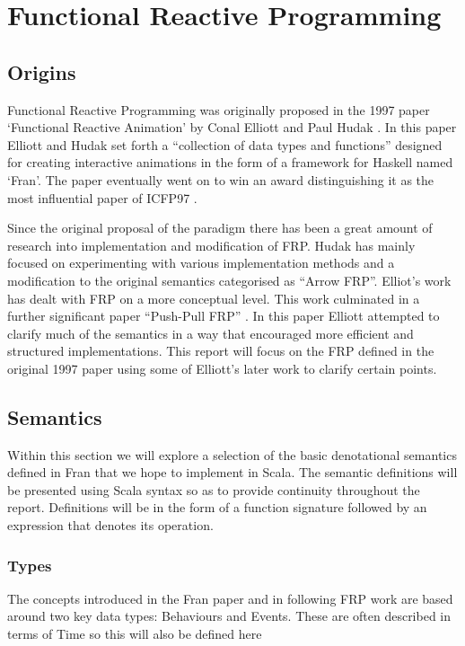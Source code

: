 \chapter{Functional Reactive Programming}
  \section{Origins}
    Functional Reactive Programming was originally proposed in the 1997 paper `Functional
    Reactive Animation' by Conal Elliott and Paul Hudak \cite{Elliott1997}. In this paper Elliott and Hudak
    set forth a ``collection of data types and functions'' designed for creating interactive 
    animations in the form of a framework for Haskell named `Fran'. The paper eventually went on to
    win an award distinguishing it as the most influential paper of ICFP97 \cite{SIGPLAN}. 
    
    Since the original proposal of the paradigm there has been a great amount of research
    into implementation and modification of FRP. Hudak has mainly focused on experimenting with various
    implementation methods and a modification to the original semantics categorised as ``Arrow FRP''. Elliot's
    work has dealt with FRP on a more conceptual level. This work culminated in a further significant paper
    ``Push-Pull FRP'' \cite{Elliott2009}. In this paper Elliott attempted to clarify much of the semantics in a way that encouraged more efficient 
    and
    structured implementations. This report will focus on the FRP defined in the original 1997 paper using
    some of Elliott's later work to clarify certain points.

  \section{Semantics}
    Within this section we will explore a selection of the basic denotational semantics defined in Fran
    that we hope to implement in Scala. The semantic definitions will
    be presented using Scala syntax so as to provide continuity throughout the report. Definitions will
    be in the form of a function signature followed by an expression that denotes its operation.
  
    \subsection{Types}
      The concepts introduced in the Fran paper and in following FRP work are based around two key data types: 
      Behaviours and Events. These are often described in terms of Time so this will also be defined here
      
